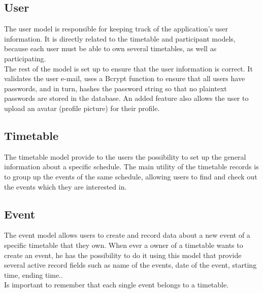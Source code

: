 \subsection{User}
\vspace{-5mm}
The user model is responsible for keeping track of the application's user information. It is directly related to the timetable and participant models, because each user must be able to own several timetables, as well as participating.\\ 
The rest of the model is set up to ensure that the user information is correct. It validates the user e-mail, uses a Bcrypt function to ensure that all users have passwords, and in turn, hashes the password string so that no plaintext passwords are stored in the database. An added feature also allows the user to upload an avatar (profile picture) for their profile. \cite{wiki:RoR}

\subsection{Timetable}
\vspace{-5mm}
The timetable model provide to the users the possibility to set up the general information about a specific schedule. The main utility of the timetable records is to group up the events of the same schedule, allowing users to find and check out the events which they are interested in.
\subsection{Event}
\vspace{-5mm}
The event model allows users to create and record data about a new event of a specific timetable that they own. When ever a owner of a timetable wants to create an event, he has the possibility to do it using this model that provide several active record fields such as name of the events, date of the event, starting time, ending time.. \\
Is important to remember that each single event belongs to a timetable.
